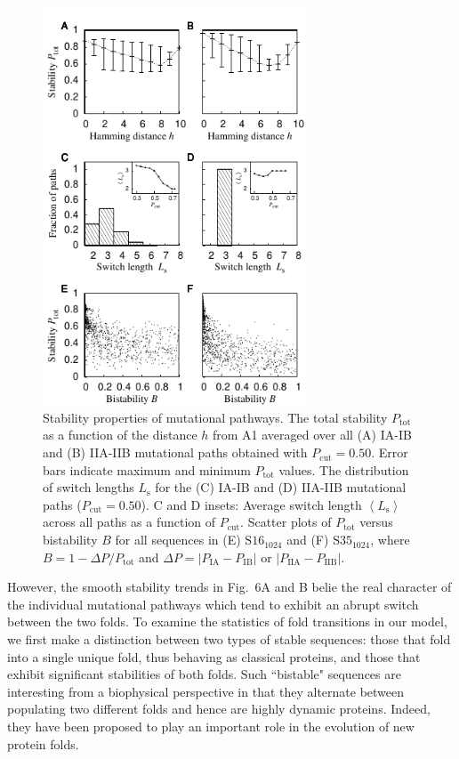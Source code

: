\documentclass[
aip,
rsi,%
amsmath,amssymb,
reprint,%
]{revtex4-1}
\newcommand {\Pcut}     	{{P_\mathrm{cut}}}
\newcommand {\Ptot}	{{P_\mathrm{tot}}}
\newcommand {\PIA}    	{{P_\mathrm{IA}}}
\newcommand {\PIB}    	{{P_\mathrm{IB}}}
\newcommand {\PIIA}    	{{P_\mathrm{IIA}}}
\newcommand {\PIIB}    	{{P_\mathrm{IIB}}}
\newcommand {\SI}		{${\mathrm{S16}_{1024}}$}
\newcommand {\SII}		{${\mathrm{S35}_{1024}}$}
\begin{document}
\begin{figure}
\includegraphics[width=7.8cm]{Paths}
\caption{Stability properties of mutational pathways. The total stability $\Ptot$ as a function of the distance $h$ from A1 averaged over all (A) IA-IB and (B) IIA-IIB mutational paths obtained with $\Pcut=0.50$. Error bars indicate maximum and minimum $\Ptot$ values. The distribution of switch lengths $L_\mathrm{s}$ for the (C) IA-IB and (D) IIA-IIB mutational paths ($\Pcut=0.50$). C and D insets: Average switch length $\left < L_\mathrm{s}\right >$ across all paths as a function of $\Pcut$. Scatter plots of $\Ptot$ versus bistability $B$ for all sequences in (E) {\SI} and (F) {\SII}, where $B=1-\Delta P/\Ptot$ and $\Delta P = |\PIA-\PIB|$ or $|\PIIA-\PIIB|$.}
\end{figure}


However, the smooth stability trends in Fig.~6A and B belie the real character of the individual mutational pathways which tend to exhibit an abrupt switch between the two folds. To examine the statistics of fold transitions in our model, we first make a distinction between two types of stable sequences: those that fold into a single unique fold, thus behaving as classical proteins, and those that exhibit significant stabilities of both folds. Such ``bistable" sequences are interesting from a biophysical perspective in that they alternate between populating two different folds and hence are highly dynamic proteins. Indeed, they have been proposed to play an important role in the evolution of new protein folds.~\cite{Sikosek2016} 
\end{document}

